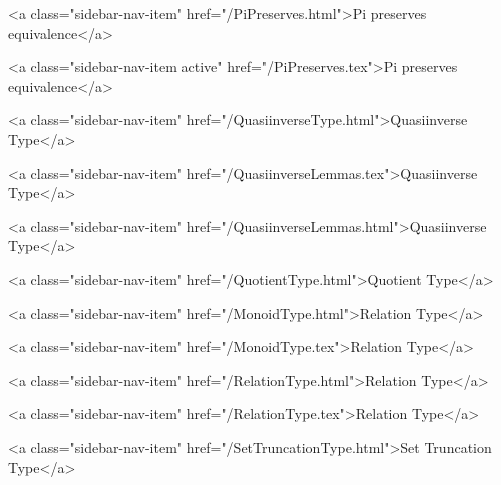       
        
          <a class="sidebar-nav-item" href="/PiPreserves.html">Pi preserves equivalence</a>
        
      
    
      
        
          <a class="sidebar-nav-item active" href="/PiPreserves.tex">Pi preserves equivalence</a>
        
      
    
      
        
          <a class="sidebar-nav-item" href="/QuasiinverseType.html">Quasiinverse Type</a>
        
      
    
      
        
          <a class="sidebar-nav-item" href="/QuasiinverseLemmas.tex">Quasiinverse Type</a>
        
      
    
      
        
          <a class="sidebar-nav-item" href="/QuasiinverseLemmas.html">Quasiinverse Type</a>
        
      
    
      
        
          <a class="sidebar-nav-item" href="/QuotientType.html">Quotient Type</a>
        
      
    
      
        
          <a class="sidebar-nav-item" href="/MonoidType.html">Relation Type</a>
        
      
    
      
        
          <a class="sidebar-nav-item" href="/MonoidType.tex">Relation Type</a>
        
      
    
      
        
          <a class="sidebar-nav-item" href="/RelationType.html">Relation Type</a>
        
      
    
      
        
          <a class="sidebar-nav-item" href="/RelationType.tex">Relation Type</a>
        
      
    
      
        
          <a class="sidebar-nav-item" href="/SetTruncationType.html">Set Truncation Type</a>
        
